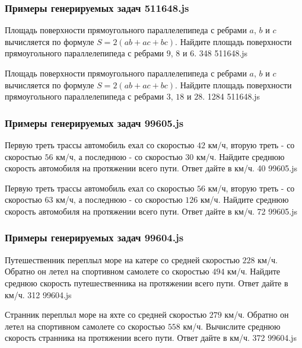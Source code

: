 \subsubsection*{Примеры генерируемых задач 511648.js}   

\par{Площадь поверхности прямоугольного параллелепипеда с ребрами $a$, $b$ и $c$ вычисляется по формуле $S=2(ab+ac+bc)$. Найдите площадь поверхности прямоугольного параллелепипеда с ребрами $9$, $8$ и $6$. }{ 348 }{511648.js}
\par{Площадь поверхности прямоугольного параллелепипеда с ребрами $a$, $b$ и $c$ вычисляется по формуле $S=2(ab+ac+bc)$. Найдите площадь поверхности прямоугольного параллелепипеда с ребрами $3$, $18$ и $28$. }{ 1284 }{511648.js}


\subsubsection*{Примеры генерируемых задач 99605.js}   

\par{Первую треть трассы автомобиль ехал со скоростью $42$ км/ч, вторую треть - со скоростью $56$ км/ч, а последнюю - со скоростью $30$ км/ч. Найдите среднюю скорость автомобиля на протяжении всего пути. Ответ дайте в км/ч. }{ 40 }{99605.js}
\par{Первую треть трассы автомобиль ехал со скоростью $56$ км/ч, вторую треть - со скоростью $63$ км/ч, а последнюю - со скоростью $126$ км/ч. Найдите среднюю скорость автомобиля на протяжении всего пути. Ответ дайте в км/ч. }{ 72 }{99605.js}


\subsubsection*{Примеры генерируемых задач 99604.js}   

\par{Путешественник переплыл море на катере со средней скоростью $228$ км/ч. Обратно он летел на спортивном самолете со скоростью $494$ км/ч. Найдите среднюю скорость путешественника на протяжении всего пути. Ответ дайте в км/ч. }{ 312 }{99604.js}
\par{Странник переплыл море на яхте со средней скоростью $279$ км/ч. Обратно он летел на спортивном самолете со скоростью $558$ км/ч. Вычислите среднюю скорость странника на протяжении всего пути. Ответ дайте в км/ч. }{ 372 }{99604.js}

